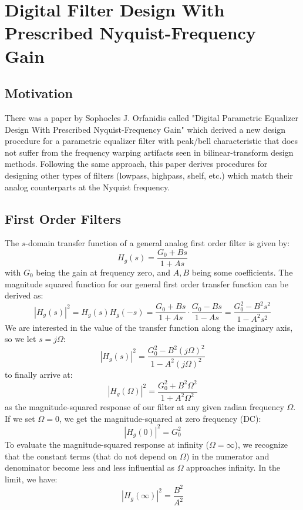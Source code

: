 \section{Digital Filter Design With Prescribed Nyquist-Frequency Gain}


\subsection{Motivation}
There was a paper by Sophocles J. Orfanidis called "Digital Parametric Equalizer Design With Prescribed Nyquist-Frequency Gain" which derived a new design procedure for a parametric equalizer filter with peak/bell characteristic that does not suffer from the frequency warping artifacts seen in bilinear-transform design methods. Following the same approach, this paper derives procedures for designing other types of filters (lowpass, highpass, shelf, etc.) which match their analog counterparts at the Nyquist frequency.


\subsection{First Order Filters}
The $s$-domain transfer function of a general analog first order filter is given by:
\begin{equation}
 H_g(s) = \frac{G_0 + B s}{1 + A s}
\end{equation}
with $G_0$ being the gain at frequency zero, and $A, B$ being some coefficients. The magnitude squared function for our general first order transfer function can be derived as:
\begin{equation}
 |H_g(s)|^2 = H_g(s) H_g(-s) 
 = \frac{G_0 + B s}{1 + A s} \cdot \frac{G_0 - B s}{1 - A s} 
 = \frac{G_0^2 - B^2 s^2}{1 - A^2 s^2} 
\end{equation}
We are interested in the value of the transfer function along the imaginary axis, so we let $s = j \Omega$:
\begin{equation}
 |H_g(s)|^2 = \frac{G_0^2 - B^2 (j \Omega)^2}{1 - A^2 (j \Omega)^2} 
\end{equation}
to finally arrive at:
\begin{equation}
 |H_g(\Omega)|^2 = \frac{G_0^2 + B^2 \Omega^2}{1 + A^2 \Omega^2} 
\end{equation}
as the magnitude-squared response of our filter at any given radian frequency $\Omega$. If we set $\Omega = 0$, we get the magnitude-squared at zero frequency (DC):
\begin{equation}
 |H_g(0)|^2 = G_0^2
\end{equation}
To evaluate the magnitude-squared response at infinity ($\Omega = \infty$), we recognize that the constant terms (that do not depend on $\Omega$) in the numerator and denominator become less and less influential as $\Omega$ approaches infinity. In the limit, we have:
\begin{equation}
 \label{Eq:MagSqAtInfGeneral}
 |H_g(\infty)|^2 = \frac{B^2}{A^2}
\end{equation}


